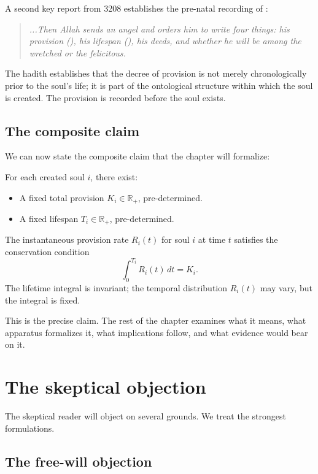 A second key report from  3208 establishes
the pre-natal recording of :

\begin{quote}
\textit{...Then Allah sends an angel and orders him to write four
things: his provision (), his lifespan (),
his deeds, and whether he will be among the wretched or the
felicitous.}
\end{quote}

The hadith establishes that the decree of provision is not merely
chronologically prior to the soul's life; it is part of the
ontological structure within which the soul is created. The
provision is recorded before the soul exists.

\subsection{The composite claim}

We can now state the composite claim that the chapter will formalize:

\begin{conceptbox}
\label{conc:rizq-claim}
For each created soul $i$, there exist:
\begin{itemize}[leftmargin=1.5em]
    \item A fixed total provision $K_i \in \mathbb{R}_+$,
    pre-determined.
    \item A fixed lifespan $T_i \in \mathbb{R}_+$, pre-determined.
\end{itemize}
The instantaneous provision rate $R_i(t)$ for soul $i$ at time $t$
satisfies the conservation condition
\[
    \int_0^{T_i} R_i(t)\, dt = K_i.
\]
The lifetime integral is invariant; the temporal distribution
$R_i(t)$ may vary, but the integral is fixed.
\end{conceptbox}

This is the precise claim. The rest of the chapter examines what it
means, what apparatus formalizes it, what implications follow, and
what evidence would bear on it.

\section{The skeptical objection}
\label{sec:rizq-objection}

The skeptical reader will object on several grounds. We treat the
strongest formulations.

\subsection{The free-will objection}

